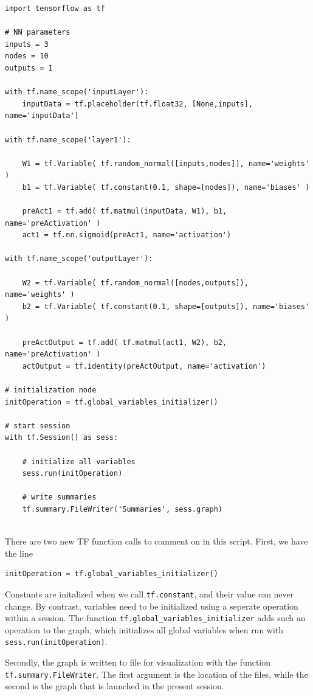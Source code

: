\documentclass[twoside,english]{uiofysmaster}
\begin{document}
\begin{verbatim}
import tensorflow as tf

# NN parameters
inputs = 3
nodes = 10
outputs = 1

with tf.name_scope('inputLayer'):
    inputData = tf.placeholder(tf.float32, [None,inputs], name='inputData')

with tf.name_scope('layer1'):
    
    W1 = tf.Variable( tf.random_normal([inputs,nodes]), name='weights' )
    b1 = tf.Variable( tf.constant(0.1, shape=[nodes]), name='biases' )
 
    preAct1 = tf.add( tf.matmul(inputData, W1), b1, name='preActivation' ) 
    act1 = tf.nn.sigmoid(preAct1, name='activation')

with tf.name_scope('outputLayer'):
    
    W2 = tf.Variable( tf.random_normal([nodes,outputs]), name='weights' )
    b2 = tf.Variable( tf.constant(0.1, shape=[outputs]), name='biases' )

    preActOutput = tf.add( tf.matmul(act1, W2), b2, name='preActivation' ) 
    actOutput = tf.identity(preActOutput, name='activation')
    
# initialization node
initOperation = tf.global_variables_initializer()

# start session
with tf.Session() as sess:
    
    # initialize all variables
    sess.run(initOperation)
    
    # write summaries
    tf.summary.FileWriter('Summaries', sess.graph)
 
\end{verbatim}
There are two new TF function calls to comment on in this script. First, we have the line
\begin{lstlisting}[language=Python]
 initOperation = tf.global_variables_initializer()
\end{lstlisting}
Constants are initalized when we call \texttt{tf.constant}, and their value can never change. 
By contrast, variables need to be initialized using a seperate operation within a session. 
The function \texttt{tf.global\_variables\_initializer} adds such an operation to the graph, which initializes
all global variables when run with \texttt{sess.run(initOperation)}. 

Secondly, the graph is written to file for visualization with the function \texttt{tf.summary.FileWriter}. 
The first argument is the location of the files, while the second is the graph that is launched in the
present session. 
\end{document}
